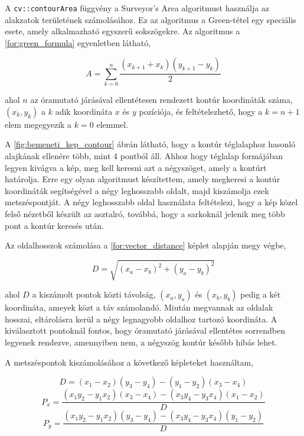 \par A \lstinline{cv::contourArea} függvény a Surveyor's Area algoritmust \cite{braden1986surveyor} használja az alakzatok területének számolásához. Ez az algoritmus a Green-tétel egy speciális esete, amely alkalmazható egyszerű sokszögekre.
\newline Az algoritmus a \ref{for:green_formula} egyenletben látható,

\begin{equation}
    A = \sum^n_{k=0}\frac{(x_{k+1} + x_k)(y_{k+1} - y_k)}{2}
    \label{for:green_formula}
\end{equation}

\par ahol $n$ az óramutató járásával ellentétesen rendezett kontúr koordináták száma, $(x_k, y_k)$ a $k$ adik koordináta $x$ és $y$ pozíciója, és feltételezhető, hogy a $k = n+1$ elem megegyezik a $k = 0$ elemmel.

\par A \ref{fig:bemeneti_kep_contour} ábrán látható, hogy a kontúr téglalaphoz hasonló alajkának ellenére több, mint 4 pontból áll. Ahhoz hogy téglalap formájában legyen kivágva a kép, meg kell keresni azt a négyszöget, amely a kontúrt határolja. Erre egy olyan algoritmust készítettem, amely megkeresi a kontúr koordináták segítségével a négy leghosszabb oldalt, majd kiszámolja ezek metszéspontját. A négy leghosszabb oldal használata feltételezi, hogy a kép közel felső nézetből készült az asztalró, továbbá, hogy a sarkoknál jelenik meg több pont a kontúr keresés után.
\par Az oldalhosszok számolása a \ref{for:vector_distance} képlet alapján megy végbe,

\begin{equation}
    D = \sqrt{(x_a-x_b)^2 + (y_a-y_b)^2}
    \label{for:vector_distance}
\end{equation}

\par ahol $D$ a kiszámolt pontok közti távolság, $(x_a,y_a)$ és $(x_b,y_b)$ pedig a két koordináta, ameyek közt a táv számolandó. Miután megvannak az oldalak hosszai, eltárolásra kerül a négy legnagyobb oldalhoz tartozó koordináta. A kiválasztott pontoknál fontos, hogy óramutató járásával ellentétes sorrendben legyenek rendezve, amennyiben nem, a négyszög kontúr később hibás lehet.
\par A metszéspontok kiszámolásához a következő képleteket \cite{line_line} használtam,

\begin{equation}
    D = (x_1 - x_2)(y_3 - y_4) - (y_1 - y_2)(x_3 - x_4)
    \label{for:vector_intersection_denominator}
\end{equation}
\begin{equation}
    P_x = \frac{(x_1y_2 - y_1x_2)(x_3 - x_4) - (x_3y_4 - y_3x_4)(x_1 - x_2)}{D}
    \label{for:vector_intersection_point_x}
\end{equation}
\begin{equation}
    P_y = \frac{(x_1y_2 - y_1x_2)(y_3 - y_4) - (x_3y_4 - y_3x_4)(y_1 - y_2)}{D}
    \label{for:vector_intersection_point_y}
\end{equation}

